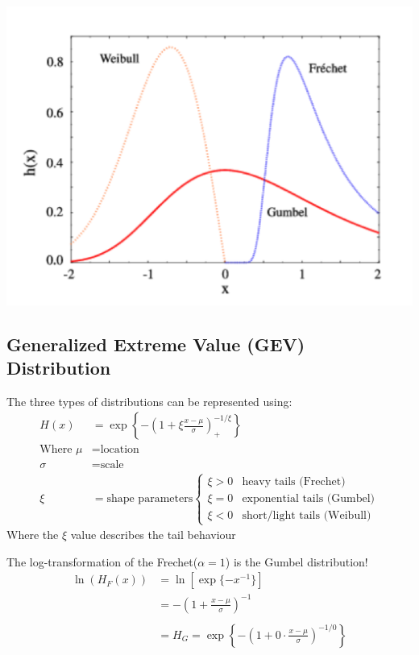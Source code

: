 \documentclass[
  oneside]{book}
\begin{document}
\includegraphics{Notes/Obsidian-Attachments/3-Modelling-Extreme-Events.png}

\hypertarget{generalized-extreme-value-gev-distribution}{%
\subsection{Generalized Extreme Value (GEV) Distribution}\label{generalized-extreme-value-gev-distribution}}

The three types of distributions can be represented using:
\[
\begin{aligned}
H(x) &= \exp\left\{ -\left( 1+\xi\frac{x-\mu}{\sigma} \right)^{-1/\xi}_{+} \right\}\\
\text{Where } \mu &= \text{location}\\
\sigma &= \text{scale}\\
\xi &= \text{shape parameters} \begin{cases}
\xi>0 & \text{heavy tails (Frechet)} \\
\xi=0 & \text{exponential tails (Gumbel)} \\
\xi < 0  & \text{short/light tails (Weibull)}
\end{cases}
\end{aligned}
\]
Where the \(\xi\) value describes the tail behaviour

The log-transformation of the Frechet(\(\alpha=1\)) is the Gumbel distribution!
\[
\begin{aligned}
\ln(H_{F}(x)) &= \ln\left[ \exp\{-x^{-1}\}\right]\\
&= -\left( 1+\frac{x-\mu}{\sigma} \right)^{-1}\\
\\
&= H_{G} = \exp \left\{ -\left( 1+0\cdot \frac{x-\mu}{\sigma} \right)^{-1/0} \right\}
\end{aligned}
\]
\end{document}
